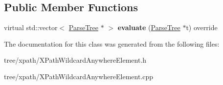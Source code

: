 \subsection*{Public Member Functions}
\begin{DoxyCompactItemize}
\item 
\mbox{\label{classantlr4_1_1tree_1_1xpath_1_1XPathWildcardAnywhereElement_ac83a2b4eada408569191d17b6db89db2}} 
virtual std\+::vector$<$ \hyperlink{classantlr4_1_1tree_1_1ParseTree}{Parse\+Tree} $\ast$ $>$ {\bfseries evaluate} (\hyperlink{classantlr4_1_1tree_1_1ParseTree}{Parse\+Tree} $\ast$t) override
\end{DoxyCompactItemize}


The documentation for this class was generated from the following files\+:\begin{DoxyCompactItemize}
\item 
tree/xpath/X\+Path\+Wildcard\+Anywhere\+Element.\+h\item 
tree/xpath/X\+Path\+Wildcard\+Anywhere\+Element.\+cpp\end{DoxyCompactItemize}
